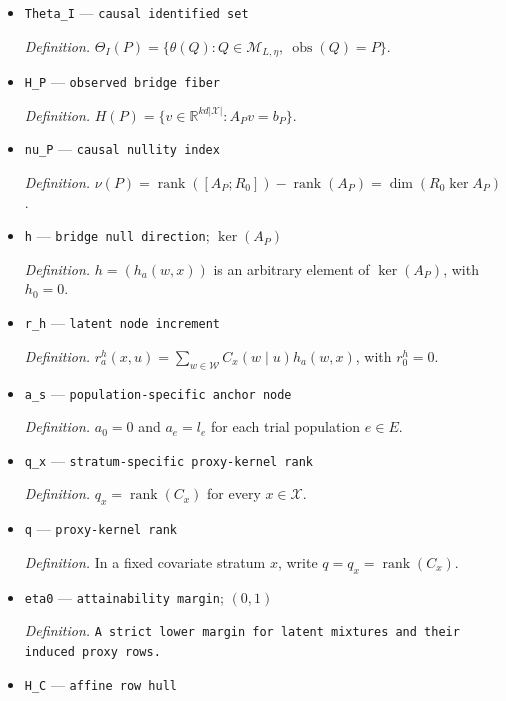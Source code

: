 \documentclass{article}
\begin{document}
\begin{itemize}
  \par\smallskip\noindent\emph{Definition.} \(\theta_a=\mathbb E_Q[Y(a)-Y(0)\mid S=0]\).
  \item \texttt{Theta\_\allowbreak{}I} --- \texttt{causal identified set}
  \par\smallskip\noindent\emph{Definition.} \(\Theta_I(P)=\{\theta(Q):Q\in\mathcal M_{L,\eta},\ \operatorname{obs}(Q)=P\}\).
  \item \texttt{H\_\allowbreak{}P} --- \texttt{observed bridge fiber}
  \par\smallskip\noindent\emph{Definition.} \(H(P)=\{v\in\mathbb R^{k d|\mathcal X|}:A_Pv=b_P\}\).
  \item \texttt{nu\_\allowbreak{}P} --- \texttt{causal nullity index}
  \par\smallskip\noindent\emph{Definition.} \(\nu(P)=\operatorname{rank}([A_P;R_0])-\operatorname{rank}(A_P)=\dim(R_0\ker A_P)\).
  \item \texttt{h} --- \texttt{bridge null direction}; \(\ker(A_P)\)
  \par\smallskip\noindent\emph{Definition.} \(h=(h_a(w,x))\) is an arbitrary element of \(\ker(A_P)\), with \(h_0=0\).
  \item \texttt{r\_\allowbreak{}h} --- \texttt{latent node increment}
  \par\smallskip\noindent\emph{Definition.} \(r^h_a(x,u)=\sum_{w\in\mathcal W}C_x(w\mid u)h_a(w,x)\), with \(r^h_0=0\).
  \item \texttt{a\_\allowbreak{}s} --- \texttt{population-\allowbreak{}specific anchor node}
  \par\smallskip\noindent\emph{Definition.} \(a_0=0\) and \(a_e=l_e\) for each trial population \(e\in E\).
  \item \texttt{q\_\allowbreak{}x} --- \texttt{stratum-\allowbreak{}specific proxy-\allowbreak{}kernel rank}
  \par\smallskip\noindent\emph{Definition.} \(q_x=\operatorname{rank}(C_x)\) for every \(x\in\mathcal X\).
  \item \texttt{q} --- \texttt{proxy-\allowbreak{}kernel rank}
  \par\smallskip\noindent\emph{Definition.} In a fixed covariate stratum \(x\), write \(q=q_x=\operatorname{rank}(C_x)\).
  \item \texttt{eta0} --- \texttt{attainability margin}; \((0,1)\)
  \par\smallskip\noindent\emph{Definition.} \texttt{A strict lower margin for latent mixtures and their induced proxy rows.}
  \item \texttt{H\_\allowbreak{}C} --- \texttt{affine row hull}

\end{itemize}
\end{document}
